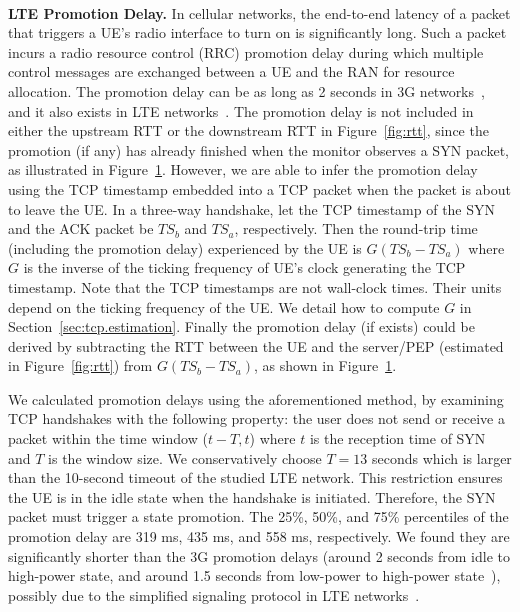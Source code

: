 \begin{figure}[t]
\centering
{}\\
\label{fig:promo2}
\end{figure}

\textbf{LTE Promotion Delay.}
In cellular networks, the end-to-end latency of a packet that triggers a UE's radio interface to turn on is significantly long. Such a packet incurs a radio resource control (RRC) promotion delay during which multiple control messages are exchanged between a UE and the RAN for resource allocation. The promotion delay can be as long as 2 seconds in 3G networks~\cite{imc.3g}, and it also exists in LTE networks~\cite{huang_mobisys12}. The promotion delay is not included in either the upstream RTT or the downstream RTT in Figure~\ref{fig:rtt}, since the promotion (if any) has already finished when the monitor observes a SYN packet, as illustrated in Figure~\ref{fig:promo2}. However, we are able to infer the promotion delay using the TCP timestamp embedded into a TCP packet when the packet is about to leave the UE. In a three-way handshake, let the TCP timestamp of the SYN and the ACK packet be $TS_{b}$ and $TS_{a}$, respectively. Then the round-trip time (including the promotion delay) experienced by the UE is $G(TS_{b}-TS_{a})$ where $G$ is the inverse of the ticking frequency of UE's clock generating the TCP timestamp. Note that the TCP timestamps are not wall-clock times. Their units depend on the ticking frequency of the UE. We detail how to compute $G$ in Section~\ref{sec:tcp.estimation}. Finally the promotion delay (if exists) could be derived by subtracting the RTT between the UE and the server/PEP (estimated in Figure~\ref{fig:rtt}) from $G(TS_{b}-TS_{a})$, as shown in Figure~\ref{fig:promo2}.

We calculated promotion delays using the aforementioned method, by examining TCP handshakes with the following property: the user does not send or receive a packet within the time window ($t-T, t$) where $t$ is the reception time of SYN and $T$ is the window size. We conservatively choose $T=13$ seconds which is larger than the 10-second timeout of the studied LTE network. This restriction ensures the UE is in the idle state when the handshake is initiated. Therefore, the SYN packet must trigger a state promotion. The 25\%, 50\%, and 75\% percentiles of the promotion delay are 319 ms, 435 ms, and 558 ms, respectively. We found they are significantly shorter than the 3G promotion delays (around 2 seconds from idle to high-power state, and around 1.5 seconds from low-power to high-power state~\cite{imc.3g}), possibly due to the simplified signaling protocol in LTE networks~\cite{4gbook}.

